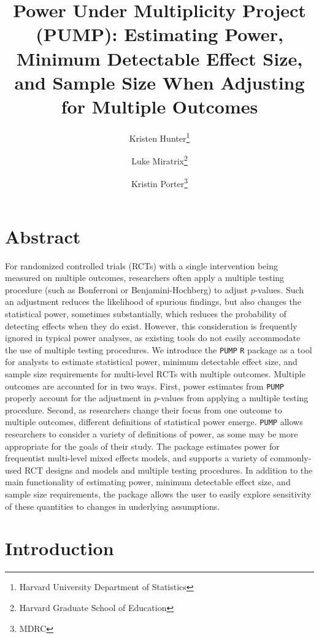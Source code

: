 \documentclass[
]{article}
\title{Power Under Multiplicity Project (PUMP): Estimating Power,
Minimum Detectable Effect Size, and Sample Size When Adjusting for
Multiple Outcomes}
\author{Kristen Hunter\footnote{Harvard University Department of
  Statistics} \and Luke Miratrix\footnote{Harvard Graduate School of
  Education} \and Kristin Porter\footnote{MDRC}}
\date{}
\begin{document}
\maketitle

\section*{Abstract}

For randomized controlled trials (RCTs) with a single intervention being
measured on multiple outcomes, researchers often apply a multiple
testing procedure (such as Bonferroni or Benjamini-Hochberg) to adjust
\(p\)-values. Such an adjustment reduces the likelihood of spurious
findings, but also changes the statistical power, sometimes
substantially, which reduces the probability of detecting effects when
they do exist. However, this consideration is frequently ignored in
typical power analyses, as existing tools do not easily accommodate the
use of multiple testing procedures. We introduce the \texttt{PUMP}
\texttt{R} package as a tool for analysts to estimate statistical power,
minimum detectable effect size, and sample size requirements for
multi-level RCTs with multiple outcomes. Multiple outcomes are accounted
for in two ways. First, power estimates from \texttt{PUMP} properly
account for the adjustment in \(p\)-values from applying a multiple
testing procedure. Second, as researchers change their focus from one
outcome to multiple outcomes, different definitions of statistical power
emerge. \texttt{PUMP} allows researchers to consider a variety of
definitions of power, as some may be more appropriate for the goals of
their study. The package estimates power for frequentist multi-level
mixed effects models, and supports a variety of commonly-used RCT
designs and models and multiple testing procedures. In addition to the
main functionality of estimating power, minimum detectable effect size,
and sample size requirements, the package allows the user to easily
explore sensitivity of these quantities to changes in underlying
assumptions.

\section{Introduction}
\label{sec:intro}
\end{document}
